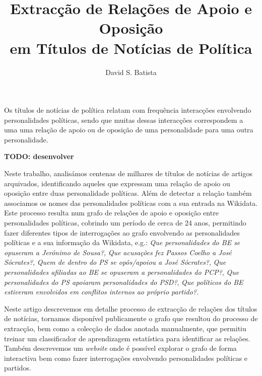 \documentclass[a4paper, twocolumn, 11pt, twoside]{article}
\title{Extracção de Relações de Apoio e Oposição \\em Títulos de Notícias de Política}
\author{
  David S. Batista \\
  \email{dsbatista@gmail.com} 
}
\begin{document}
\maketitle

\begin{resumo}
Os títulos de notícias de política relatam com frequência interacções envolvendo personalidades políticas, sendo que  muitas dessas interacções correspondem a uma uma relação de apoio ou de oposição de uma personalidade para uma outra personalidade.

{\bf TODO: desenvolver}

Neste trabalho, analisámos centenas de milhares de títulos de notícias de artigos arquivados, identificando aqueles que expressam uma relação de apoio ou oposição entre duas personalidade políticas. Além de detectar a relação também associamos os nomes das personalidades políticas com a sua entrada na Wikidata. Este processo resulta num grafo de relações de apoio e oposição entre personalidades políticas, cobrindo um período de cerca de 24 anos, permitindo fazer diferentes tipos de interrogações ao grafo envolvendo as personalidades políticas e a sua informação da Wikidata, e.g.: \textit{Que personalidades do BE se opuseram a Jerónimo de Sousa?}, \textit{Que acusações fez Passos Coelho a José Sócrates?}, \textit{Quem de dentro do PS se opôs/apoiou a José Sócrates?}, \textit{Que personalidades afiliadas ao BE se opuseram a personalidades do PCP?}, \textit{Que personalidades do PS apoiaram personalidades do PSD?}, \textit{Que políticos do BE estiveram envolvidos em conflitos internos ao próprio partido?}.

Neste artigo descrevemos em detalhe processo de extracção de relações dos títulos de notícias, tornamos disponível publicamente o grafo que resultou do processo de extracção, bem como a colecção de dados anotada manualmente, que permitiu treinar um classificador de aprendizagem estatística para identificar as relações. Também descrevemos um \textit{website} onde é possível explorar o grafo de forma interactiva bem como fazer interrogações envolvendo personalidades políticas e partidos.

\end{resumo}

\end{document}
